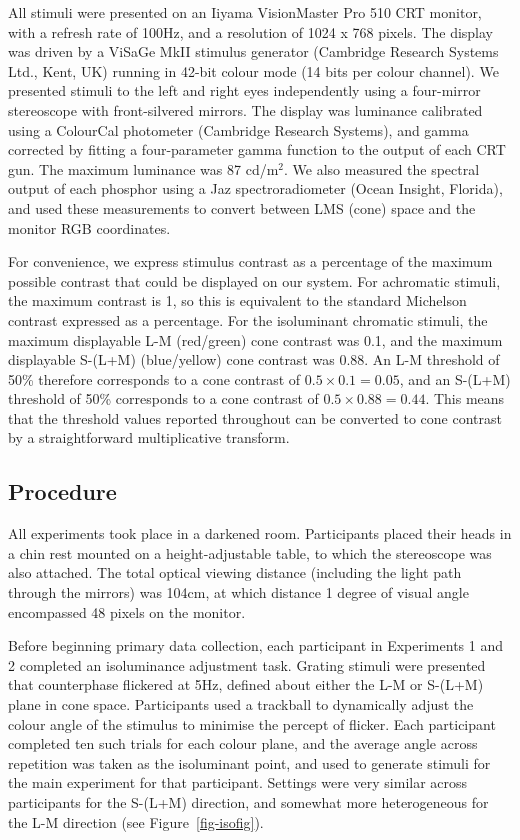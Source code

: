\documentclass[
  letterpaper,
  DIV=11,
  numbers=noendperiod]{scrartcl}
\begin{document}
All stimuli were presented on an Iiyama VisionMaster Pro 510 CRT
monitor, with a refresh rate of 100Hz, and a resolution of 1024 x 768
pixels. The display was driven by a ViSaGe MkII stimulus generator
(Cambridge Research Systems Ltd., Kent, UK) running in 42-bit colour
mode (14 bits per colour channel). We presented stimuli to the left and
right eyes independently using a four-mirror stereoscope with
front-silvered mirrors. The display was luminance calibrated using a
ColourCal photometer (Cambridge Research Systems), and gamma corrected
by fitting a four-parameter gamma function to the output of each CRT
gun. The maximum luminance was 87 cd/m\(^2\). We also measured the
spectral output of each phosphor using a Jaz spectroradiometer (Ocean
Insight, Florida), and used these measurements to convert between LMS
(cone) space and the monitor RGB coordinates.

For convenience, we express stimulus contrast as a percentage of the
maximum possible contrast that could be displayed on our system. For
achromatic stimuli, the maximum contrast is 1, so this is equivalent to
the standard Michelson contrast expressed as a percentage. For the
isoluminant chromatic stimuli, the maximum displayable L-M (red/green)
cone contrast was 0.1, and the maximum displayable S-(L+M) (blue/yellow)
cone contrast was 0.88. An L-M threshold of 50\% therefore corresponds
to a cone contrast of \(0.5\times0.1 = 0.05\), and an S-(L+M) threshold
of 50\% corresponds to a cone contrast of \(0.5\times0.88 = 0.44\). This
means that the threshold values reported throughout can be converted to
cone contrast by a straightforward multiplicative transform.

\hypertarget{procedure}{%
\subsection{Procedure}\label{procedure}}

All experiments took place in a darkened room. Participants placed their
heads in a chin rest mounted on a height-adjustable table, to which the
stereoscope was also attached. The total optical viewing distance
(including the light path through the mirrors) was 104cm, at which
distance 1 degree of visual angle encompassed 48 pixels on the monitor.

Before beginning primary data collection, each participant in
Experiments 1 and 2 completed an isoluminance adjustment task. Grating
stimuli were presented that counterphase flickered at 5Hz, defined about
either the L-M or S-(L+M) plane in cone space. Participants used a
trackball to dynamically adjust the colour angle of the stimulus to
minimise the percept of flicker. Each participant completed ten such
trials for each colour plane, and the average angle across repetition
was taken as the isoluminant point, and used to generate stimuli for the
main experiment for that participant. Settings were very similar across
participants for the S-(L+M) direction, and somewhat more heterogeneous
for the L-M direction (see Figure~\ref{fig-isofig}).
\end{document}
